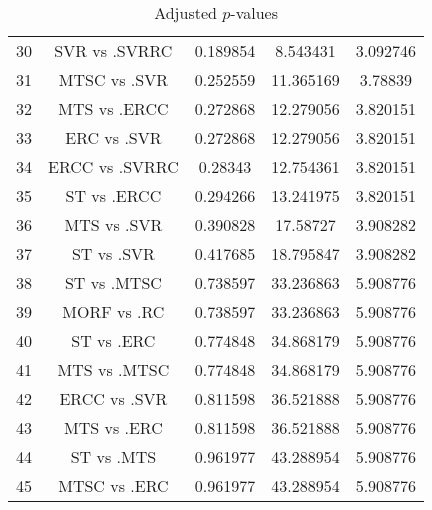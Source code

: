 \documentclass[a4paper,10pt]{article}
\begin{document}
\begin{landscape}
\begin{table}[!htp]
\begin{tabular}{ccccc}
30&SVR vs .SVRRC&0.189854&8.543431&3.092746\\
31&MTSC vs .SVR&0.252559&11.365169&3.78839\\
32&MTS vs .ERCC&0.272868&12.279056&3.820151\\
33&ERC vs .SVR&0.272868&12.279056&3.820151\\
34&ERCC vs .SVRRC&0.28343&12.754361&3.820151\\
35&ST vs .ERCC&0.294266&13.241975&3.820151\\
36&MTS vs .SVR&0.390828&17.58727&3.908282\\
37&ST vs .SVR&0.417685&18.795847&3.908282\\
38&ST vs .MTSC&0.738597&33.236863&5.908776\\
39&MORF vs .RC&0.738597&33.236863&5.908776\\
40&ST vs .ERC&0.774848&34.868179&5.908776\\
41&MTS vs .MTSC&0.774848&34.868179&5.908776\\
42&ERCC vs .SVR&0.811598&36.521888&5.908776\\
43&MTS vs .ERC&0.811598&36.521888&5.908776\\
44&ST vs .MTS&0.961977&43.288954&5.908776\\
45&MTSC vs .ERC&0.961977&43.288954&5.908776\\
\hline
\end{tabular}
\caption{Adjusted $p$-values}
\end{table}

\end{landscape}
\end{document}
